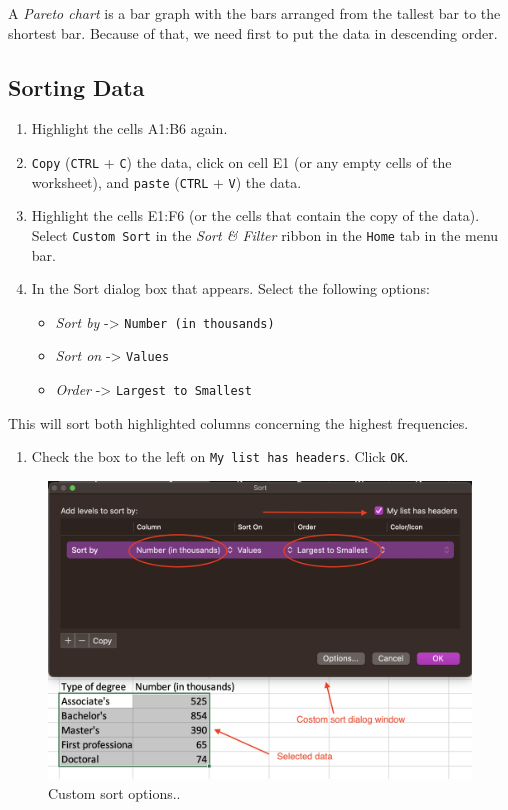 \documentclass[
]{book}
\providecommand{\tightlist}{%
  \setlength{\itemsep}{0pt}\setlength{\parskip}{0pt}}
\begin{document}
A \emph{Pareto chart} is a bar graph with the bars arranged from the tallest bar to the shortest bar. Because of that, we need first to put the data in descending order.

\hypertarget{sorting-data-1}{%
\subsection{Sorting Data}\label{sorting-data-1}}

\begin{enumerate}
\def\labelenumi{\arabic{enumi}.}
\tightlist
\item
  Highlight the cells A1:B6 again.
\item
  \texttt{Copy} (\texttt{CTRL} + \texttt{C}) the data, click on cell E1 (or any empty cells of the worksheet), and \texttt{paste} (\texttt{CTRL} + \texttt{V}) the data.
\item
  Highlight the cells E1:F6 (or the cells that contain the copy of the data). Select \texttt{Custom\ Sort} in the \emph{Sort \& Filter} ribbon in the \texttt{Home} tab in the menu bar.
\item
  In the Sort dialog box that appears. Select the following options:

  \begin{itemize}
  \tightlist
  \item
    \emph{Sort by} -\textgreater{} \texttt{Number\ (in\ thousands)}
  \item
    \emph{Sort on} -\textgreater{} \texttt{Values}
  \item
    \emph{Order} -\textgreater{} \texttt{Largest\ to\ Smallest}
  \end{itemize}
\end{enumerate}

This will sort both highlighted columns concerning the highest frequencies.

\begin{enumerate}
\def\labelenumi{\arabic{enumi}.}
\setcounter{enumi}{4}
\tightlist
\item
  Check the box to the left on \texttt{My\ list\ has\ headers}. Click \texttt{OK}.
\end{enumerate}

\begin{figure}

{\centering \includegraphics[width=0.7\linewidth]{sorting-earn-degree-data} 

}

\caption{Custom sort options..}\label{fig:sorting-earn-degree-data}
\end{figure}
\end{document}
